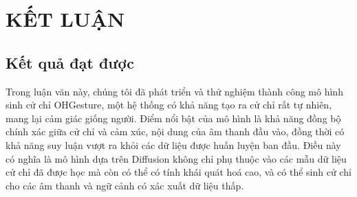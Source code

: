 \chapter{KẾT LUẬN}
\label{Chapter5}

\section{Kết quả đạt được}

%
%

Trong luận văn này, chúng tôi đã phát triển và thử nghiệm thành công mô hình sinh cử chỉ OHGesture, một hệ thống có khả năng tạo ra cử chỉ rất tự nhiên, mang lại cảm giác giống người. Điểm nổi bật của mô hình là khả năng đồng bộ chính xác giữa cử chỉ và cảm xúc, nội dung của âm thanh đầu vào, đồng thời có khả năng suy luận vượt ra khỏi các dữ liệu được huấn luyện ban đầu. Điều này có nghĩa là mô hình dựa trên Diffusion không chỉ phụ thuộc vào các mẫu dữ liệu cử chỉ đã được học mà còn có thể có tính khái quát hoá cao, và có thể sinh cử chỉ cho các âm thanh và ngữ cảnh có xác xuất dữ liệu thấp.


